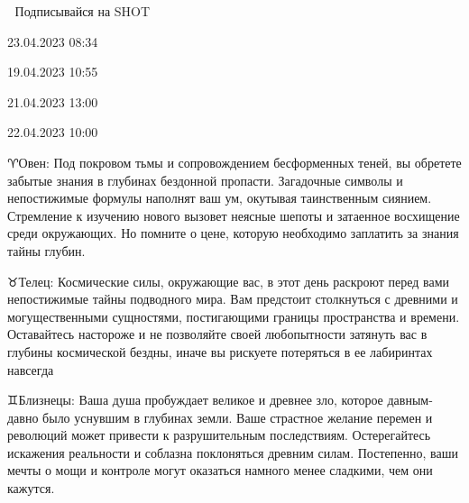 \documentclass{article}
\begin{document}
\begin{multicols}{3}
🎯 Подписывайся на SHOT

23.04.2023 08:34\closearticle
{}

\begin{window}

19.04.2023 10:55 \end{window}
\closearticle
{}

\begin{window}

21.04.2023 13:00 \end{window}
\closearticle
{}

\begin{window}

22.04.2023 10:00 \end{window}
\closearticle
{}


♈️Овен: Под покровом тьмы и сопровождением бесформенных теней, вы обретете забытые знания в глубинах бездонной пропасти. Загадочные символы и непостижимые формулы наполнят ваш ум, окутывая таинственным сиянием. Стремление к изучению нового вызовет неясные шепоты и затаенное восхищение среди окружающих. Но помните о цене, которую необходимо заплатить за знания тайны глубин.

♉️Телец: Космические силы, окружающие вас, в этот день раскроют перед вами непостижимые тайны подводного мира. Вам предстоит столкнуться с древними и могущественными сущностями, постигающими границы пространства и времени. Оставайтесь настороже и не позволяйте своей любопытности затянуть вас в глубины космической бездны, иначе вы рискуете потеряться в ее лабиринтах навсегда

♊️Близнецы: Ваша душа пробуждает великое и древнее зло, которое давным-давно было уснувшим в глубинах земли. Ваше страстное желание перемен и революций может привести к разрушительным последствиям. Остерегайтесь искажения реальности и соблазна поклоняться древним силам. Постепенно, ваши мечты о мощи и контроле могут оказаться намного менее сладкими, чем они кажутся.


\end{multicols}
\end{document}
